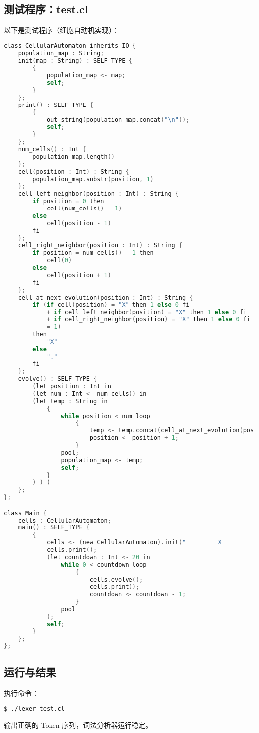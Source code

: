 \documentclass[a4paper,12pt]{article}
\begin{document}
\subsection{测试程序：test.cl}
以下是测试程序（细胞自动机实现）：
\begin{lstlisting}[language=C]
class CellularAutomaton inherits IO {
    population_map : String;
    init(map : String) : SELF_TYPE {
        {
            population_map <- map;
            self;
        }
    };
    print() : SELF_TYPE {
        {
            out_string(population_map.concat("\n"));
            self;
        }
    };
    num_cells() : Int {
        population_map.length()
    };
    cell(position : Int) : String {
        population_map.substr(position, 1)
    };
    cell_left_neighbor(position : Int) : String {
        if position = 0 then
            cell(num_cells() - 1)
        else
            cell(position - 1)
        fi
    };
    cell_right_neighbor(position : Int) : String {
        if position = num_cells() - 1 then
            cell(0)
        else
            cell(position + 1)
        fi
    };
    cell_at_next_evolution(position : Int) : String {
        if (if cell(position) = "X" then 1 else 0 fi
            + if cell_left_neighbor(position) = "X" then 1 else 0 fi
            + if cell_right_neighbor(position) = "X" then 1 else 0 fi
            = 1)
        then
            "X"
        else
            "."
        fi
    };
    evolve() : SELF_TYPE {
        (let position : Int in
        (let num : Int <- num_cells() in
        (let temp : String in
            {
                while position < num loop
                    {
                        temp <- temp.concat(cell_at_next_evolution(position));
                        position <- position + 1;
                    }
                pool;
                population_map <- temp;
                self;
            }
        ) ) )
    };
};

class Main {
    cells : CellularAutomaton;
    main() : SELF_TYPE {
        {
            cells <- (new CellularAutomaton).init("         X         ");
            cells.print();
            (let countdown : Int <- 20 in
                while 0 < countdown loop
                    {
                        cells.evolve();
                        cells.print();
                        countdown <- countdown - 1;
                    }
                pool
            );
            self;
        }
    };
};
\end{lstlisting}

\subsection{运行与结果}
执行命令：
\begin{lstlisting}
$ ./lexer test.cl
\end{lstlisting}
输出正确的 Token 序列，词法分析器运行稳定。
\end{document}
